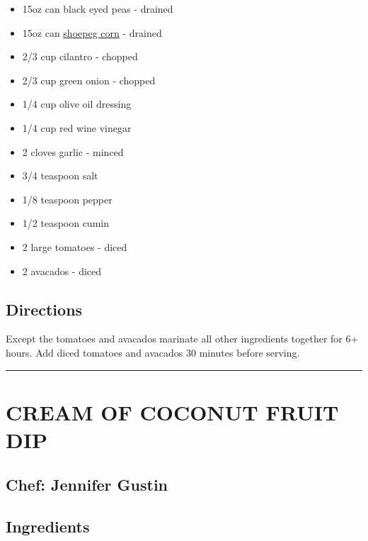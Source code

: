 \documentclass[
]{book}
\providecommand{\tightlist}{%
  \setlength{\itemsep}{0pt}\setlength{\parskip}{0pt}}
\begin{document}
\begin{itemize}
\tightlist
\item
  15oz can black eyed peas - drained
\item
  15oz can \href{https://en.wikipedia.org/wiki/Shoepeg_corn}{shoepeg corn} - drained
\item
  2/3 cup cilantro - chopped
\item
  2/3 cup green onion - chopped
\item
  1/4 cup olive oil dressing
\item
  1/4 cup red wine vinegar
\item
  2 cloves garlic - minced
\item
  3/4 teaspoon salt
\item
  1/8 teaspoon pepper
\item
  1/2 teaspoon cumin
\item
  2 large tomatoes - diced
\item
  2 avacados - diced
\end{itemize}

\hypertarget{directions-1}{%
\subsection*{Directions}\label{directions-1}}


Except the tomatoes and avacados marinate all other ingredients together for 6+ hours.
Add diced tomatoes and avacados 30 minutes before serving.

\begin{center}\rule{0.5\linewidth}{0.5pt}\end{center}

\hypertarget{cream-of-coconut-fruit-dip}{%
\section*{CREAM OF COCONUT FRUIT DIP}\label{cream-of-coconut-fruit-dip}}


\hypertarget{chef-jennifer-gustin}{%
\subsection*{Chef: Jennifer Gustin}\label{chef-jennifer-gustin}}


\hypertarget{ingredients-2}{%
\subsection*{Ingredients}\label{ingredients-2}}
\end{document}
